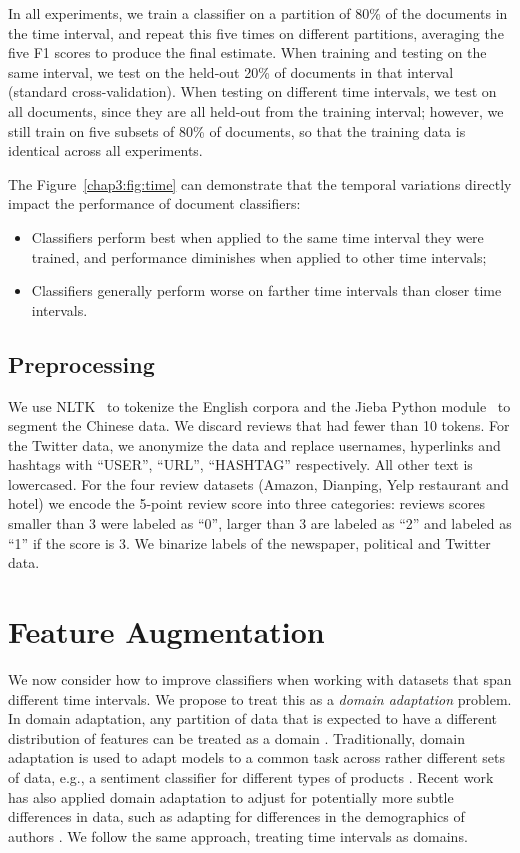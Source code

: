 In all experiments, we train a classifier on a partition of 80\% of the documents in the time interval, and repeat this five times on different partitions, averaging the five F1 scores to produce the final estimate. When training and testing on the same interval, we test on the held-out 20\% of documents in that interval (standard cross-validation).
When testing on different time intervals, we test on all documents, since they are all held-out from the training interval; however, we still train on five subsets of 80\% of documents, so that the training data is identical across all experiments.

The Figure~\ref{chap3:fig:time} can demonstrate that the temporal variations directly impact the performance of document classifiers: 
\begin{itemize}
    \item Classifiers perform best when applied to the same time interval they were trained, and performance diminishes when applied to other time intervals;
    \item Classifiers generally perform worse on farther time intervals than closer time intervals.
\end{itemize}

\subsection{Preprocessing}
We use NLTK~\cite{bird2004nltk} to tokenize the English corpora and the Jieba Python module~\cite{sun2012jieba} to segment the Chinese data. 
We discard reviews that had fewer than 10 tokens. 
For the Twitter data, we anonymize the data and replace usernames, hyperlinks and hashtags with ``USER'', ``URL'', ``HASHTAG'' respectively. 
All other text is lowercased.
For the four review datasets (Amazon, Dianping, Yelp restaurant and hotel) we encode the 5-point review score into three categories: reviews scores smaller than 3 were labeled as ``0'', larger than 3 are labeled as ``2'' and labeled as ``1'' if the score is 3. We binarize labels of the newspaper, political and Twitter data. 


\section{Feature Augmentation}
\label{chap3:sec:fa}

We now consider how to improve classifiers when working with datasets that span different time intervals.
We propose to treat this as a {\em domain adaptation} problem.
In domain adaptation, any partition of data that is expected to have a different distribution of features can be treated as a domain \cite{joshi2013s}.
Traditionally, domain adaptation is used to adapt models to a common task across rather different sets of data, e.g., a sentiment classifier for different types of products \cite{blitzer2007biographies}.
Recent work has also applied domain adaptation to adjust for potentially more subtle differences in data, such as adapting for differences in the demographics of authors \cite{volkova2013exploring, lynn2017human}.
We follow the same approach, treating time intervals as domains.

